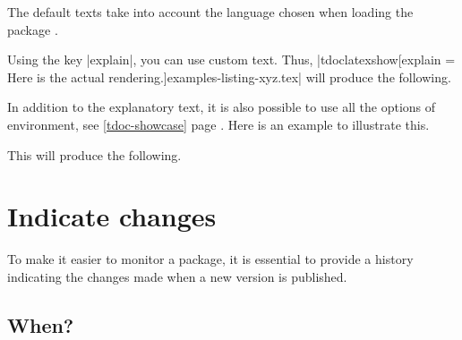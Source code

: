 \begin{tdocnote}
    The default texts take into account the language chosen when loading the package \thispack{}.
\end{tdocnote}




\begin{tdocexa}
    Using the key \tdocinlatex|explain|, you can use custom text. Thus, \tdocinlatex|tdoclatexshow[explain = Here is the actual rendering.]{examples-listing-xyz.tex}| will produce the following.

    \medskip

    \begin{tdoc-doc-showcase}

    \end{tdoc-doc-showcase}
\end{tdocexa}




\begin{tdocexa}
    In addition to the explanatory text, it is also possible to use all the options of  environment, see \ref{tdoc-showcase} page \pageref{tdoc-showcase}.
    Here is an example to illustrate this.

    \medskip



    \medskip

    This will produce the following.

    \medskip

    \begin{tdoc-doc-showcase}
        

    \end{tdoc-doc-showcase}
\end{tdocexa}


\section{Indicate changes}

To make it easier to monitor a package, it is essential to provide a history indicating the changes made when a new version is published.



\subsection{When?}

